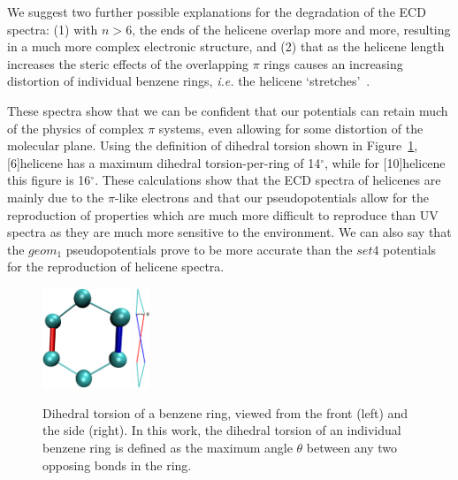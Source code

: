 \documentclass[aip,reprint,nofootinbib]{revtex4-1}
\begin{document}
We suggest two further possible explanations for the degradation of the ECD spectra: (1) with $n > 6$, the ends of the helicene overlap more and more, resulting in a much more complex electronic structure, and (2) that as the helicene length increases the steric effects of the overlapping $\pi$ rings causes an increasing distortion of individual benzene rings, \emph{i.e.} the helicene `stretches'~\cite{rickhaus_2015}.

These spectra show that we can be confident that our potentials can retain much of the physics of complex $\pi$ systems, even allowing for some distortion of the molecular plane. Using the definition of dihedral torsion shown in Figure~\ref{fig:distortiondef}, [6]helicene has a maximum dihedral torsion-per-ring of 14$^{\circ}$, while for [10]helicene this figure is 16$^{\circ}$. These calculations show that the ECD spectra of helicenes are mainly due to the $\pi$-like electrons and that our pseudopotentials allow for the reproduction of properties which are much more difficult to reproduce than UV spectra as they are much more sensitive to the environment. We can also say that the $geom_1$ pseudopotentials prove to be more accurate than the $set4$ potentials for the reproduction of helicene spectra.

\begin{figure}
\begin{center}
\includegraphics[height=3cm]{dihedraldef}
\hspace{2cm}
\includegraphics[height=3cm]{thiccerdihedral}
\end{center}
\caption[Definition of dihedral torsion for benzene]{Dihedral torsion of a benzene ring, viewed from the front (left) and the side (right). In this work, the dihedral torsion of an individual benzene ring is defined as the maximum angle $\theta$ between any two opposing bonds in the ring.}\label{fig:distortiondef}
\end{figure}
\end{document}
